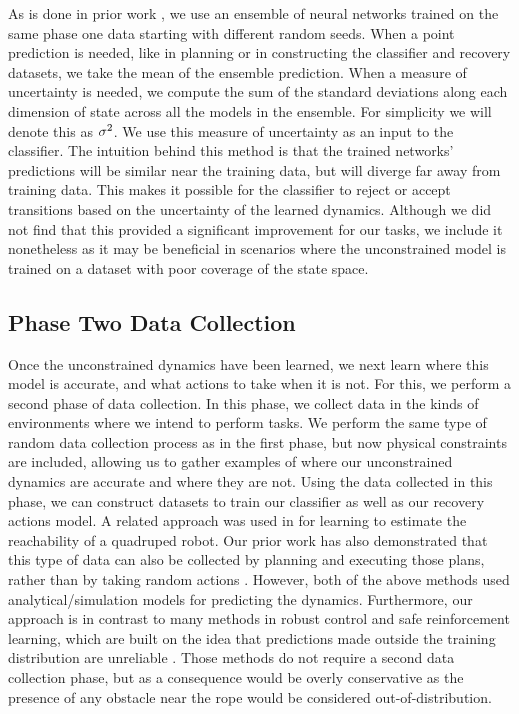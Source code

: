 As is done in prior work \cite{Gal2016,Chua2018,Lakshminarayanan2017}, we use an ensemble of neural networks trained on the same phase one data starting with different random seeds. When a point prediction is needed, like in planning or in constructing the classifier and recovery datasets, we take the mean of the ensemble prediction. When a measure of uncertainty is needed, we compute the sum of the standard deviations along each dimension of state across all the models in the ensemble. For simplicity we will denote this as $\sigma^2$. We use this measure of uncertainty as an input to the classifier. The intuition behind this method is that the trained networks' predictions will be similar near the training data, but will diverge far away from training data. This makes it possible for the classifier to reject or accept transitions based on the uncertainty of the learned dynamics. Although we did not find that this provided a significant improvement for our tasks, we include it nonetheless as it may be beneficial in scenarios where the unconstrained model is trained on a dataset with poor coverage of the state space.

\subsection{Phase Two Data Collection}
\label{Scirob:sec:phase_two_collection}

Once the unconstrained dynamics have been learned, we next learn where this model is accurate, and what actions to take when it is not. For this, we perform a second phase of data collection. In this phase, we collect data in the kinds of environments where we intend to perform tasks. We perform the same type of random data collection process as in the first phase, but now physical constraints are included, allowing us to gather examples of where our unconstrained dynamics are accurate and where they are not. Using the data collected in this phase, we can construct datasets to train our classifier as well as our recovery actions model. A related approach was used in \cite{Guzzi2020} for learning to estimate the reachability of a quadruped robot. Our prior work has also demonstrated that this type of data can also be collected by planning and executing those plans, rather than by taking random actions \cite{McConachie2020}. However, both of the above methods used analytical/simulation models for predicting the dynamics. Furthermore, our approach is in contrast to many methods in robust control and safe reinforcement learning, which are built on the idea that predictions made outside the training distribution are unreliable \cite{Zhou1998,Gal2016}. Those methods do not require a second data collection phase, but as a consequence would be overly conservative as the presence of any obstacle near the rope would be considered out-of-distribution.

